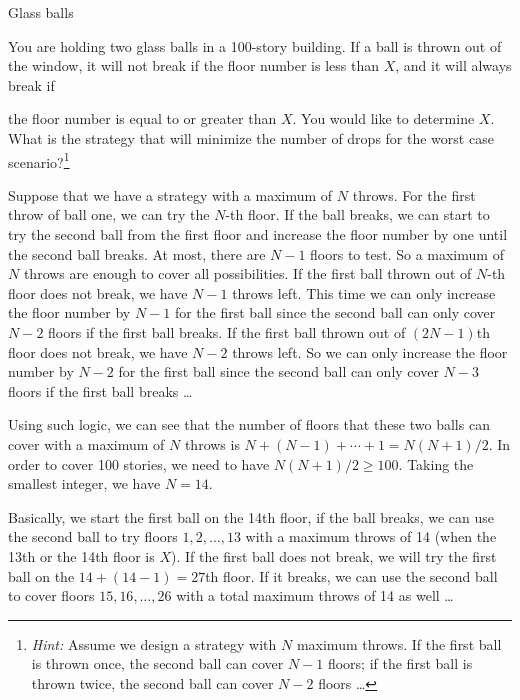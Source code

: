 \begin{problem}{Glass balls}

You are holding two glass balls in a 100-story building. If a ball is thrown out of the
window, it will not break if the floor number is less than $X$, and it will always break if

the floor number is equal to or greater than $X$. You would like to determine $X$. What is the
strategy that will minimize the number of drops for the worst case scenario?\footnote[10]{\emph{Hint:} Assume we design a strategy with $N$ maximum throws. If the first ball is thrown once, the second ball can cover $N-1$ floors; if the first ball is thrown twice, the second ball can cover $N-2$ floors \ldots}
\end{problem}

\begin{solution}
Suppose that we have a strategy with a maximum of $N$ throws. For the first throw of
ball one, we can try the $N$-th floor. If the ball breaks, we can start to try the second ball
from the first floor and increase the floor number by one until the second ball breaks. At
most, there are $N-1$ floors to test. So a maximum of $N$ throws are enough to cover all
possibilities. If the first ball thrown out of $N$-th floor does not break, we have $N-1$
throws left. This time we can only increase the floor number by $N-1$ for the first ball
since the second ball can only cover $N-2$ floors if the first ball breaks. If the first ball
thrown out of $(2N-1)$th floor does not break, we have $N-2$ throws left. So we can only
increase the floor number by $N-2$ for the first ball since the second ball can only cover
$N-3$ floors if the first ball breaks \ldots

Using such logic, we can see that the number of floors that these two balls can cover with
a maximum of $N$ throws is $N+(N-1)+\cdots+1=N(N+1)/2$. In order to cover 100
stories, we need to have $N(N+1)/2\geq100$. Taking the smallest integer, we have $N=14$.

Basically, we start the first ball on the 14th floor, if the ball breaks, we can use the
second ball to try floors $1,2,\ldots,13$ with a maximum throws of 14 (when the 13th or the
14th floor is $X$). If the first ball does not break, we will try the first ball on the
$14+(14-1)=27$th floor. If it breaks, we can use the second ball to cover floors
$15,16,\ldots,26$ with a total maximum throws of 14 as well \ldots
\end{solution}

